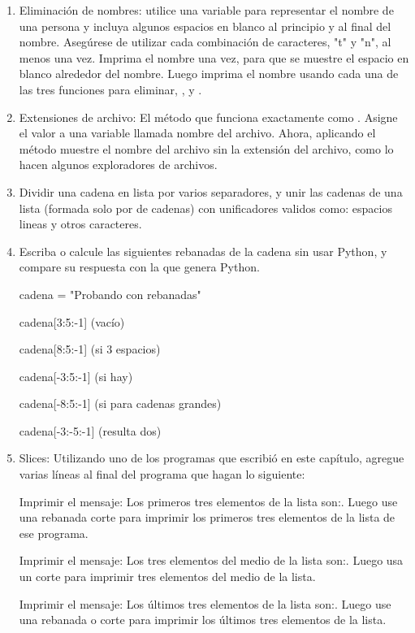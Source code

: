\begin{enumerate}[3.5.1]
	
	\item Eliminación de nombres: utilice una variable para representar el nombre de una persona y
	incluya algunos espacios en blanco al principio y al final del nombre. 	Asegúrese de utilizar cada combinación de caracteres, "{}{\bf\ttfamily{\textbackslash}}t{}"{} y {}"{}{\bf\ttfamily{\textbackslash}}n{}", al menos una vez. 
	Imprima el nombre una vez, para que se muestre el espacio en blanco alrededor del nombre. 
	Luego imprima el nombre usando cada una de las tres funciones para eliminar,  {},	 {} y {}.
	
	\item Extensiones de archivo: El método {} que funciona exactamente
	como {}.  	Asigne el valor {} a una variable llamada
	nombre del archivo. Ahora, aplicando el método {} muestre el nombre del archivo sin
	la extensión del archivo, como lo hacen algunos exploradores de archivos.
	
	\item Dividir una cadena en lista por varios separadores, y unir las cadenas de una lista (formada solo por de cadenas)  con unificadores validos como: espacios lineas y otros caracteres. 
	
	\item Escriba o  calcule las siguientes rebanadas de la cadena sin usar Python, y compare su respuesta con la que genera Python. 
	
	{\ttfamily cadena = "{}Probando con rebanadas{}"{}} 
	
	cadena[3:5:-1]    (vacío)
	
	cadena[8:5:-1]    (si 3 espacios) 
	
	cadena[-3:5:-1]   (si hay) 
	
	cadena[-8:5:-1]   (si para cadenas grandes)
	
	cadena[-3:-5:-1]  (resulta dos)
	
	
	\item  Slices: Utilizando uno de los programas que escribió en este capítulo, agregue varias
	líneas al final del programa que hagan lo siguiente:
	
	Imprimir el mensaje: Los primeros tres elementos de la lista son:. 
	Luego use una rebanada corte para imprimir los primeros tres elementos de la lista de ese programa.
	
	Imprimir el mensaje: Los tres elementos del medio de la lista son:.
	Luego usa un corte para imprimir tres elementos del medio de la lista.
	
	Imprimir el mensaje: Los últimos tres elementos de la lista son:. 
	Luego use una rebanada o corte para imprimir los últimos tres elementos de la lista.
	
\end{enumerate}




